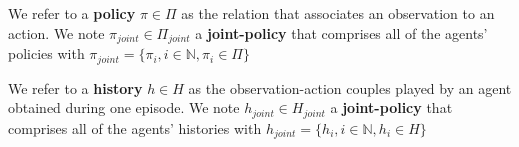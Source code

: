 \documentclass[runningheads]{llncs}
\newcounter{relation}
\begin{document}
We refer to a \textbf{policy} $\pi \in \Pi$ as the relation that associates an observation to an action. We note $\pi_{joint} \in \Pi_{joint}$ a \textbf{joint-policy} that comprises all of the agents' policies with $\pi_{joint} = \{\pi_i, i \in \mathbb{N}, \pi_i \in \Pi\}$

We refer to a \textbf{history} $h \in H$ as the observation-action couples played by an agent obtained during one episode. We note $h_{joint} \in H_{joint}$ a \textbf{joint-policy} that comprises all of the agents' histories with $h_{joint} = \{h_i, i \in \mathbb{N}, h_i \in H\}$





\end{document}
